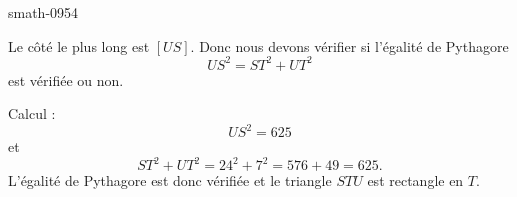 
\begin{corrige}{smath-0954}

    Le côté le plus long est \( [US]\). Donc nous devons vérifier si l'égalité de Pythagore
    \begin{equation}
        US^2=ST^2+UT^2
    \end{equation}
    est vérifiée ou non.

    Calcul :
    \begin{equation}
        US^2=625
    \end{equation}
    et
    \begin{equation}
        ST^2+UT^2=24^2+7^2=576+49=625.
    \end{equation}
    L'égalité de Pythagore est donc vérifiée et le triangle \( STU\) est rectangle en \( T\).

\end{corrige}
